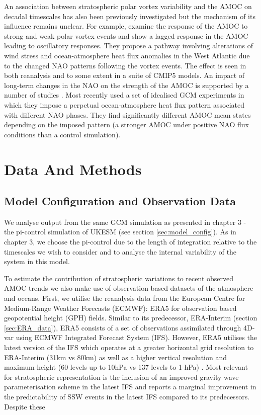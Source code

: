An association between stratospheric polar vortex variability and the AMOC on decadal timescales has also been previously investigated \citep{reichlerStratospheric2012, Schimanke2011} but the mechanism of its influence remains unclear. For example, \cite{reichlerStratospheric2012} examine the response of the AMOC to strong and weak polar vortex events and show a lagged response in the AMOC leading to oscillatory responses. They propose a pathway involving alterations of wind stress and ocean-atmosphere heat flux anomalies in the West Atlantic due to the changed NAO patterns following the vortex events. The effect is seen in both reanalysis and to some extent in a suite of CMIP5 models. An impact of long-term changes in the NAO on the strength of the AMOC is supported by a number of studies \citep{visbeckOcean1998, delworthImplications2000, delworthMultidecadal2000, edenMechanism2001}. Most recently \cite{delworthImpact2016} used a set of idealised GCM experiments in which they impose a perpetual ocean-atmosphere heat flux pattern associated with different NAO phases. They find significantly different AMOC mean states depending on the imposed pattern (a stronger AMOC under positive NAO flux conditions than a control simulation). 


\section{Data And Methods}
\subsection{Model Configuration and Observation Data}

We analyse output from the same GCM simulation as presented in chapter 3 - the pi-control simulation of UKESM (see section \ref{sec:model_config}). As in chapter 3, we choose the pi-control due to the length of integration relative to the timescales we wish to consider and to analyse the internal variability of the system in this model. 

To estimate the contribution of stratospheric variations to recent observed AMOC trends we also make use of observation based datasets of the atmosphere and oceans. First, we utilise the reanalysis data from the European Centre for Medium-Range Weather Forecasts (ECMWF): ERA5 \citep{hersbachERA52020} for observation based geopotential height (GPH) fields. Similar to its predecessor, ERA-Interim (section \ref{sec:ERA_data}), ERA5 consists of a set of observations assimilated through 4D-var using ECMWF Integrated Forecast System (IFS). However, ERA5 utilises the latest version of the IFS which operates at a greater horizontal grid resolution to ERA-Interim (31km vs 80km) as well as a higher vertical resolution and maximum height (60 levels up to 10hPa vs 137 levels to 1 hPa) \citep{hersbachERA52020}. Most relevant for stratospheric representation is the inclusion of an improved gravity wave parameterisation scheme in the latest IFS \citep{orr} and \cite{hersbachERA52020} reports a marginal improvement in the predictability of SSW events in the latest IFS compared to its predecessors. Despite these 

